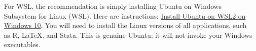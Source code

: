 For WSL, the recommendation is simply installing Ubuntu on Windows Subsystem for Linux (WSL).
Here are instructions:
\href{https://ubuntu.com/tutorials/install-ubuntu-on-wsl2-on-windows-10}{Install Ubuntu on WSL2 on Windows 10}.
You will need to install the Linux versions of all applications, such as R, LaTeX, and Stata.
This is genuine Ubuntu; it will not invoke your Windows executables.
